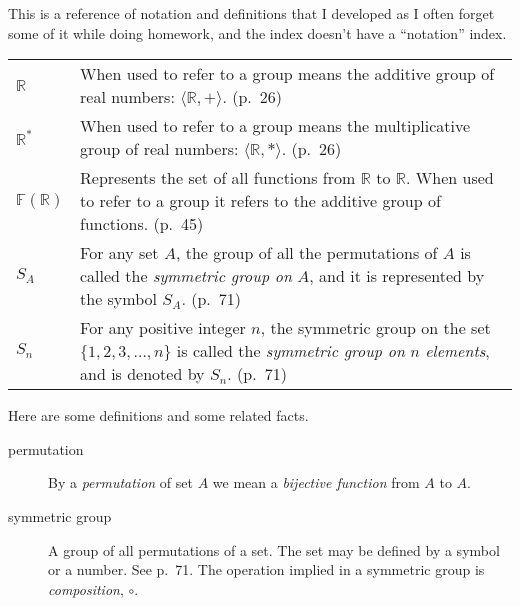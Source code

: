 \documentclass{amsart}
\newcommand{\Reals}{\ensuremath{\mathbb{R}}\xspace}
\begin{document}
This is a reference of notation and definitions that I developed as I
often forget some of it while doing homework, and the index doesn't
have a ``notation'' index.

\begin{tabular}{lp{4in}}
  $\Reals$ & When used to refer to a group means the additive group of
  real numbers: $\langle \Reals, + \rangle$. (p.~26) \\

  $\Reals^*$ & When used to refer to a group means the multiplicative
  group of real numbers: $\langle \Reals, * \rangle$. (p.~26) \\

  $\mathbb{F}(\Reals)$ & Represents the set of all functions from
  \Reals to \Reals. When used to refer to a group it refers to the
  additive group of functions. (p.~45) \\

  $S_A$ & For any set $A$, the group of all the permutations of $A$
  is called the \emph{symmetric group on} $A$, and it is represented
  by the symbol $S_A$. (p.~71) \\

  $S_n$ & For any positive integer $n$, the symmetric group on the
  set $\{1, 2, 3, \ldots, n \}$ is called the \emph{symmetric group
    on} $n$ \emph{elements}, and is denoted by $S_n$. (p.~71) \\

\end{tabular}

Here are some definitions and some related facts.

\begin{description}
  \item[permutation] By a \emph{permutation} of set $A$ we mean a
    \emph{bijective function} from $A$ to $A$.

  \item[symmetric group] A group of all permutations of a set. The set
    may be defined by a symbol or a number. See p.~71. The operation
    implied in a symmetric group is \emph{composition}, $\circ$.
\end{description}
\end{document}
